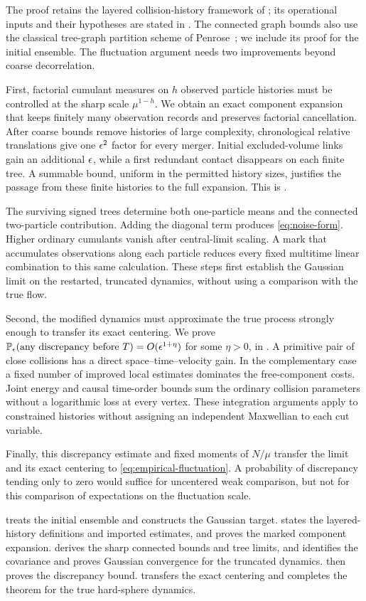 The proof retains the layered collision-history framework of
\cite{DHM2025}; its operational inputs and their hypotheses are stated in
. The connected graph bounds also use the classical
tree-graph partition scheme of Penrose~\cite{Penrose1967}; we include its
proof for the initial ensemble. The fluctuation argument needs two
improvements beyond coarse decorrelation.

First, factorial cumulant measures on \(h\) observed particle histories
must be controlled at the sharp scale \(\mu^{1-h}\). We obtain an exact
component expansion that keeps finitely many observation records and
preserves factorial cancellation. After coarse bounds remove histories
of large complexity, chronological relative translations give one
\(\epsilon^2\) factor for every merger. Initial excluded-volume links gain
an additional \(\epsilon\), while a first redundant contact disappears on
each finite tree. A summable bound, uniform in the permitted history
sizes, justifies the passage from these finite histories to the full
expansion. This is .

The surviving signed trees determine both one-particle means and the
connected two-particle contribution. Adding the diagonal term produces
\eqref{eq:noise-form}. Higher ordinary cumulants vanish after central-limit
scaling. A mark that accumulates observations along each particle reduces
every fixed multitime linear combination to this same calculation.
These steps first establish the Gaussian limit on the restarted,
truncated dynamics, without using a comparison with the true flow.

Second, the modified dynamics must approximate the true process strongly
enough to transfer its exact centering. We prove
\(\mathbb P_\epsilon(\text{any discrepancy before }T)=O(\epsilon^{1+\eta})\) for some
\(\eta>0\), in . A primitive pair of close collisions
has a direct space--time--velocity gain. In the complementary case a
fixed number of improved local estimates dominates the free-component
costs. Joint energy and causal time-order bounds sum the ordinary
collision parameters without a logarithmic loss at every vertex.
These integration arguments apply to constrained histories without
assigning an independent Maxwellian to each cut variable.

Finally, this discrepancy estimate and fixed moments of \(N/\mu\)
transfer the limit and its exact centering to
\eqref{eq:empirical-fluctuation}. A probability of discrepancy tending
only to zero would suffice for uncentered weak comparison, but not for
this comparison of expectations on the fluctuation scale.

 treats the initial ensemble and constructs the
Gaussian target.  states the layered-history
definitions and imported estimates, and 
proves the marked component expansion. 
derives the sharp connected bounds and tree limits, and
 identifies the covariance and proves Gaussian
convergence for the truncated dynamics.  then proves
the discrepancy bound.  transfers the exact centering
and completes the theorem for the true hard-sphere dynamics.
